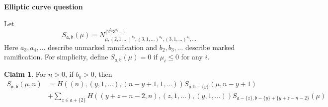 \documentclass[11pt]{article}           %
\newcommand{\thishw}{\bf Elliptic curve question}
\theoremstyle{definition}
\newtheorem*{claim}{Claim}
\theoremstyle{definition}
\begin{document}
\centerline{\LARGE\thishw}


Let
\[
S_{\mathfrak a,\mathfrak b}(\mu)=N_{\mu,(2,1,\dots)^{b_2},(3,1,\dots)^{a_3},(3,1,\dots)^{b_3},\dots}^{\{2^{b_2}3^{b_3}\dots\}}
\]
Here $a_3,a_4,\dots$ describe unmarked ramification and $b_2,b_3,\dots$ describe marked ramification. For
simplicity, define $S_{\mathfrak a,\mathfrak b}(\mu)= 0$ if $\mu_i\leq 0$ for any $i$.

\begin{claim}
  For $n>0$, if $b_y>0$, then
  \begin{align*}
    S_{\mathfrak a,\mathfrak b}(\mu, n) &=H((n),(y,1,\dots),(n-y+1,1,\dots))S_{\mathfrak a,\mathfrak b-\{y\}}(\mu, n-y+1) \\
    &+\sum_{z\in\mathfrak a+\{2\}}H((y+z-n-2,n),(z,1,\dots),(y,1,\dots))S_{\mathfrak a-\{z\},\mathfrak b-\{y\}+\{y+z-n-2\}}(\mu)
  \end{align*}
\end{claim}
\end{document}

